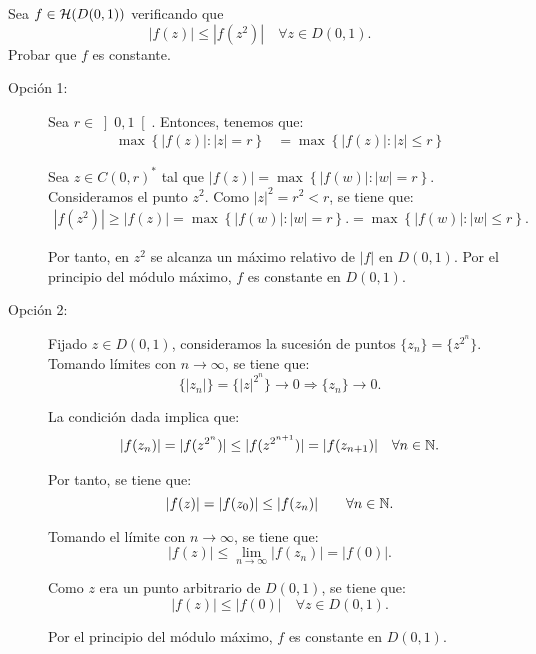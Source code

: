 \begin{ejercicio}
    Sea $f\in \mathcal{H}(D(0,1))$ verificando que
    \begin{equation*}
        |f(z)| \leq |f(z^2)| \quad \forall z\in D(0,1).
    \end{equation*}
    Probar que $f$ es constante.
    \begin{description}
        \item[Opción 1:] Sea $r\in \left]0,1\right[$. Entonces, tenemos que:
        \begin{align*}
            \max\left\{ |f(z)| : |z| = r \right\} &= \max\left\{ |f(z)| : |z|\leq r \right\}
        \end{align*}

        Sea $z\in C(0,r)^*$ tal que $|f(z)| = \max\left\{ |f(w)| : |w| = r \right\}$. Consideramos el punto $z^2$. Como $|z|^2 = r^2 < r$, se tiene que:
        \begin{align*}
            |f(z^2)| \geq |f(z)| = \max\left\{ |f(w)| : |w| = r \right\}.
            = \max\left\{ |f(w)| : |w|\leq r \right\}.
        \end{align*}

        Por tanto, en $z^2$ se alcanza un máximo relativo de $|f|$ en $D(0,1)$. Por el principio del módulo máximo, $f$ es constante en $D(0,1)$.

        \item[Opción 2:] Fijado $z\in D(0,1)$, consideramos la sucesión de puntos $\{z_n\}=\{z^{2^n}\}$. Tomando límites con $n\to \infty$, se tiene que:
        \begin{equation*}
            \{|z_n|\} = \{ |z|^{2^n} \} \to 0
            \Longrightarrow
            \{z_n\} \to 0.
        \end{equation*}

        La condición dada implica que:
        \begin{align*}
            |f(z_n)| = |f(z^{2^n})| \leq |f(z^{2^{n+1}})| = |f(z_{n+1})| \quad \forall n\in \mathbb{N}.
        \end{align*}

        Por tanto, se tiene que:
        \begin{equation*}
            |f(z)| = |f(z_0)| \leq |f(z_n)| \qquad \forall n\in \mathbb{N}.
        \end{equation*}

        Tomando el límite con $n\to \infty$, se tiene que:
        \begin{equation*}
            |f(z)| \leq \lim_{n\to \infty} |f(z_n)| = |f(0)|.
        \end{equation*}

        Como $z$ era un punto arbitrario de $D(0,1)$, se tiene que:
        \begin{equation*}
            |f(z)| \leq |f(0)| \quad \forall z\in D(0,1).
        \end{equation*}

        Por el principio del módulo máximo, $f$ es constante en $D(0,1)$.
    \end{description}
\end{ejercicio}

